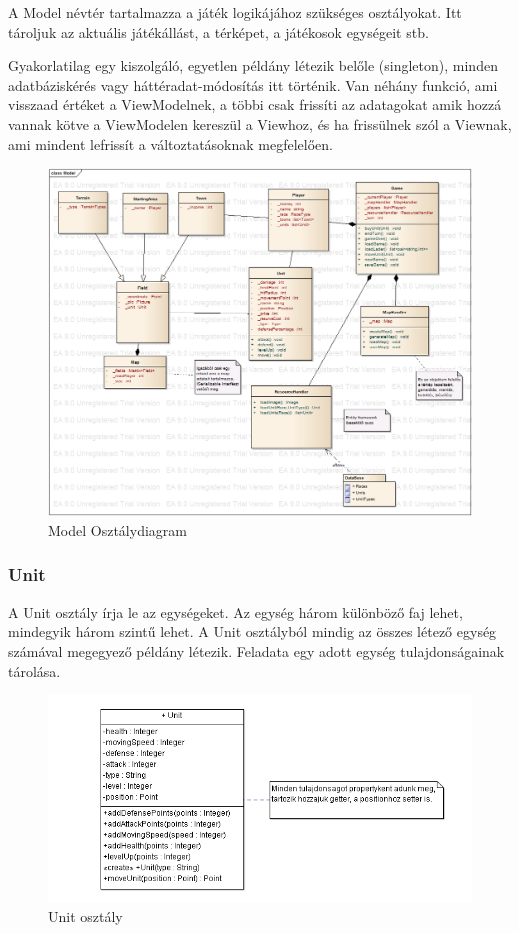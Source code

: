 \documentclass[a4paper,12pt]{report}
\begin{document}
A Model névtér tartalmazza a játék logikájához szükséges osztályokat. Itt tároljuk az aktuális játékállást, a térképet, a játékosok egységeit stb.

Gyakorlatilag egy kiszolgáló, egyetlen példány létezik belőle (singleton), minden adatbáziskérés vagy háttéradat-módosítás itt történik. Van néhány funkció, ami visszaad értéket a ViewModelnek, a többi csak frissíti az adatagokat amik hozzá vannak kötve a ViewModelen kereszül a Viewhoz, és ha frissülnek szól a Viewnak, ami mindent lefrissít a változtatásoknak megfelelően.

\begin{figure}[hbtp]
\centering
\includegraphics[width=1\textwidth]{ModelClass.png}
\caption{Model Osztálydiagram}
\label{fig:mc}
\end{figure}

\subsubsection{Unit}
A Unit osztály írja le az egységeket. Az egység három különböző faj lehet, mindegyik három szintű lehet. A Unit osztályból mindig az összes létező egység számával megegyező példány létezik. Feladata egy adott egység tulajdonságainak tárolása.

\begin{figure}[hbtp]
\centering
\includegraphics[width=1\textwidth]{Unit.png}
\caption{Unit osztály}
\label{fig:unitclass}
\end{figure}
\end{document}

